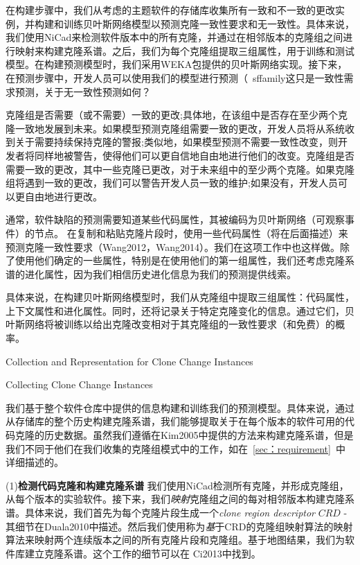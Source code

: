 在构建步骤中，我们从考虑的主题软件的存储库收集所有一致和不一致的更改实例，并构建和训练贝叶斯网络模型以预测克隆一致性要求和无一致性。具体来说，我们使用NiCad来检测软件版本中的所有克隆，并通过在相邻版本的克隆组之间进行映射来构建克隆系谱。之后，我们为每个克隆组提取三组属性，用于训练和测试模型。在构建预测模型时，我们采用WEKA包提供的贝叶斯网络实现。接下来，在预测步骤中，开发人员可以使用我们的模型进行预测{（{\ sffamily这只是一致性需求预测，关于无一致性预测如何？}}

克隆组是否需要（或不需要）一致的更改;具体地，在该组中是否存在至少两个克隆一致地发展到未来。如果模型预测克隆组需要一致的更改，开发人员将从系统收到关于需要持续保持克隆的警报;类似地，如果模型预测不需要一致性改变，则开发者将同样地被警告，使得他们可以更自信地自由地进行他们的改变。{克隆组是否需要一致的更改，其中一些克隆已更改，对于未来组中的至少两个克隆。如果克隆组将遇到一致的更改，我们可以警告开发人员一致的维护;如果没有，开发人员可以更自由地进行更改。}

通常，软件缺陷的预测需要知道某些代码属性，其被编码为贝叶斯网络（可观察事件）的节点。
在复制和粘贴克隆片段时，使用一些代码属性（将在后面描述）来预测克隆一致性要求（Wang2012，Wang2014）。我们在这项工作中也这样做。除了使用他们确定的一些属性，特别是在使用他们的第一组属性，我们还考虑克隆系谱的进化属性，因为我们相信历史进化信息为我们的预测提供线索。

具体来说，在构建贝叶斯网络模型时，我们从克隆组中提取三组属性：代码属性，上下文属性和进化属性。同时，还将记录关于特定克隆变化的信息。通过它们，贝叶斯网络将被训练以给出克隆改变相对于其克隆组的一致性要求（和免费）的概率。

{Collection and Representation for Clone Change Instances}

{Collecting Clone Change Instances} 

我们基于整个软件仓库中提供的信息构建和训练我们的预测模型。具体来说，通过从存储库的整个历史构建克隆系谱，我们能够提取关于在每个版本的软件可用的代码克隆的历史数据。虽然我们遵循在\cite {}{Kim2005}中提供的方法来构建克隆系谱，但是我们不同于他们在我们收集的克隆组模式中的工作，如在~\ref{sec：requirement}~中详细描述的。

(1){\bf 检测代码克隆和构建克隆系谱} 我们使用NiCad检测所有克隆，并形成克隆组，从每个版本的实验软件。接下来，我们{\em 映射}克隆组之间的每对相邻版本构建克隆系谱。具体来说，我们首先为每个克隆片段生成一个{\em clone region descriptor} $ \mathit {CRD} $ - 其细节在\cite {}{Duala2010}中描述。然后我们使用称为{\emph 基于CRD的克隆组映射算法}的映射算法来映射两个连续版本之间的所有克隆片段和克隆组。基于地图结果，我们为软件库建立克隆系谱。这个工作的细节可以在\cite{} {Ci2013}中找到。

